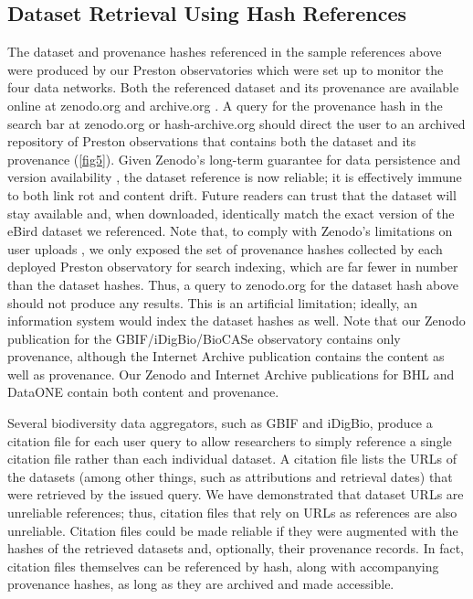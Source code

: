 \subsection*{Dataset Retrieval Using Hash References}

The dataset and provenance hashes referenced in the sample references above were produced by our Preston observatories which were set up to monitor the four data networks. Both the referenced dataset and its provenance are available online at zenodo.org \citep{poelen_jorrit_h_2019_3483218, poelen_jorrit_h_2019_3484555, poelen_jorrit_h_2019_3484205} and archive.org \citep{poelen_jorrit_h_2019_archive_org}. A query for the provenance hash in the search bar at zenodo.org or hash-archive.org should direct the user to an archived repository of Preston observations that contains both the dataset and its provenance (\ref{fig5}). Given Zenodo’s long-term guarantee for data persistence and version availability \citep{zenodo_2019}, the dataset reference is now reliable; it is effectively immune to both link rot and content drift. Future readers can trust that the dataset will stay available and, when downloaded, identically match the exact version of the eBird dataset we referenced. Note that, to comply with Zenodo’s limitations on user uploads \citep{zenodo_2019}, we only exposed the set of provenance hashes collected by each deployed Preston observatory for search indexing, which are far fewer in number than the dataset hashes. Thus, a query to zenodo.org for the dataset hash above should not produce any results. This is an artificial limitation; ideally, an information system would index the dataset hashes as well. Note that our Zenodo publication for the GBIF/iDigBio/BioCASe observatory \citep{poelen_jorrit_h_2019_3484205} contains only provenance, although the Internet Archive publication \citep{poelen_jorrit_h_2019_archive_org} contains the content as well as provenance. Our Zenodo and Internet Archive publications for BHL \citep{poelen_jorrit_h_2019_3484555, poelen_jorrit_h_2019_archive_org_bhl} and DataONE \citep{poelen_jorrit_h_2019_3483218,poelen_jorrit_h_2019_archive_org_dataone} contain both content and provenance.

Several biodiversity data aggregators, such as GBIF and iDigBio, produce a citation file for each user query to allow researchers to simply reference a single citation file rather than each individual dataset. A citation file lists the URLs of the datasets (among other things, such as attributions and retrieval dates) that were retrieved by the issued query. We have demonstrated that dataset URLs are unreliable references; thus, citation files that rely on URLs as references are also unreliable. Citation files could be made reliable if they were augmented with the hashes of the retrieved datasets and, optionally, their provenance records. In fact, citation files themselves can be referenced by hash, along with accompanying provenance hashes, as long as they are archived and made accessible.

